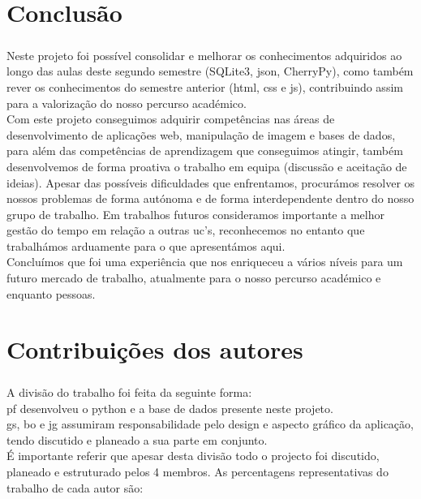 \documentclass[a4paper, 11pt, oneside]{report}
\begin{document}
\chapter{Conclusão}

\paragraph{} Neste projeto foi possível consolidar e melhorar os conhecimentos adquiridos ao longo das aulas deste segundo semestre (SQLite3, \acs{json}, CherryPy), como também rever os conhecimentos do semestre anterior (\acs{html}, \acs{css} e \acs{js}), contribuindo assim para a valorização do nosso percurso académico.\\
\indent Com este projeto conseguimos adquirir competências nas áreas de desenvolvimento de aplicações web, manipulação de imagem e bases de dados, para além das competências de aprendizagem que conseguimos atingir, também desenvolvemos de forma proativa o trabalho em equipa (discussão e aceitação de ideias). Apesar das possíveis dificuldades que enfrentamos, procurámos resolver os nossos problemas de forma autónoma e de forma interdependente dentro do nosso grupo de trabalho. Em trabalhos futuros consideramos importante a melhor gestão do tempo em relação a outras \acs{uc}'s, reconhecemos no entanto que trabalhámos arduamente para o que apresentámos aqui.\\
\indent Concluímos que foi uma experiência que nos enriqueceu a vários níveis para um futuro mercado de trabalho, atualmente para o nosso percurso académico e enquanto pessoas.

\chapter*{Contribuições dos autores}

\paragraph{} A divisão do trabalho foi feita da seguinte forma:\\
\indent \ac{pf} desenvolveu o python e a base de dados presente neste projeto.\\
\indent \ac{gs}, \ac{bo} e \ac{jg} assumiram responsabilidade pelo design e aspecto gráfico da aplicação, tendo discutido e planeado a sua parte em conjunto.\\
\indent É importante referir que apesar desta divisão todo o projecto foi discutido, planeado e estruturado pelos 4 membros. As percentagens representativas do trabalho de cada autor são:
\end{document}
